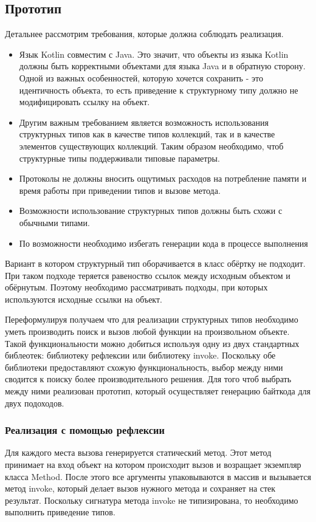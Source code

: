 \subsection{Прототип}

Детальнее рассмотрим требования, которые должна соблюдать реализация.

\begin{itemize}
\item Язык Kotlin совместим с Java. Это значит, что объекты из языка Kotlin должны быть корректными объектами для языка Java и в обратную сторону. Одной из важных особенностей, которую хочется сохранить - это идентичность объекта, то есть приведение к структурному типу должно не модифицировать ссылку на объект.
\item Другим важным требованием является возможность использования структурных типов как в качестве типов коллекций, так и в качестве элементов существующих коллекций. Таким образом необходимо, чтоб структурные типы поддерживали типовые параметры.
\item Протоколы не должны вносить ощутимых расходов на потребление памяти и время работы при приведении типов и вызове метода.
\item Возможности использование структурных типов должны быть схожи с обычными типами.
\item По возможности необходимо избегать генерации кода в процессе выполнения
\end{itemize}

Вариант в котором структурный тип оборачивается в класс обёртку не подходит. При таком подходе теряется равеноство ссылок между исходным объектом и обёрнутым. Поэтому необходимо рассматривать подходы, при которых используются исходные ссылки на объект.

Переформулируя получаем что для реализации структурных типов необходимо уметь производить поиск и вызов любой функции на произвольном объекте. Такой функциональности можно добиться используя одну из двух стандартных библеотек: библиотеку рефлексии или библиотеку invoke. Поскольку обе библиотеки предоставляют схожую функциональность, выбор между ними сводится к поиску более производительного решения. Для того чтоб выбрать между ними реализован прототип, который осуществляет генерацию байткода для двух подоходов.

\subsubsection{Реализация с помощью рефлексии}
Для каждого места вызова генерируется статический метод. Этот метод принимает на вход объект на котором происходит вызов и возращает экземпляр класса Method. После этого все аргументы упаковываются в массив и вызывается метод invoke, который делает вызов нужного метода и сохраняет на стек результат. Поскольку сигнатура метода invoke не типизирована, то необходимо выполнить приведение типов.

